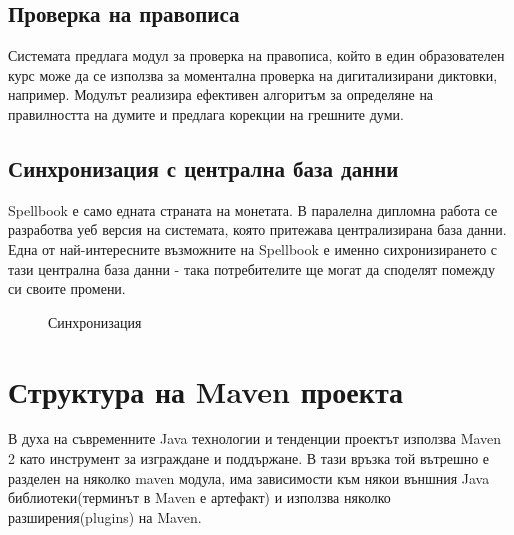 \subsection{Проверка на правописа}
Системата предлага модул за проверка на правописа, който в един
образователен курс може да се използва за моментална проверка на
дигитализирани диктовки, например. Модулът реализира ефективен
алгоритъм за определяне на правилността на думите и предлага корекции
на грешните думи. 
\subsection{Синхронизация с централна база данни}
Spellbook е само едната страната на монетата. В паралелна дипломна
работа се разработва уеб версия на системата, която притежава
централизирана база данни. Една от най-интересните възможните на
Spellbook е именно сихронизирането с тази централна база данни - така
потребителите ще могат да споделят помежду си своите промени.

\begin{figure}[htbp]
  \caption{Синхронизация}
  \centering
\end{figure} 
\section{Структура на Maven проекта}
В духа на съвременните Java технологии и тенденции проектът използва
Maven 2 като инструмент за изграждане и поддържане. В тази връзка той
вътрешно е разделен на няколко maven модула, има зависимости към някои
външния Java библиотеки(терминът в Maven е артефакт) и използва
няколко разширения(plugins) на Maven.
